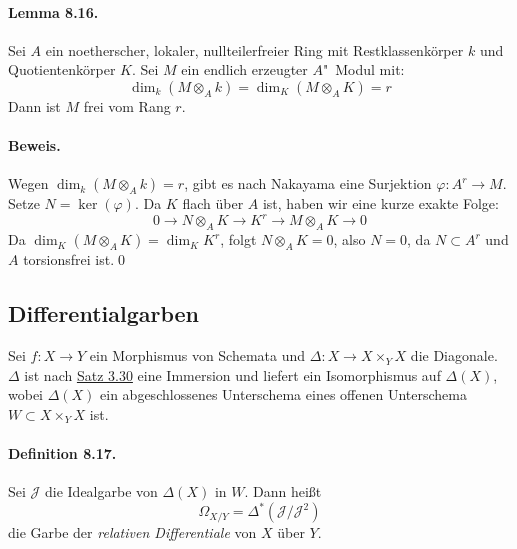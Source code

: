 \paragraph{Lemma 8.16.}\label{8.16} Sei $A$ ein noetherscher, lokaler, nullteilerfreier Ring mit Restklassenkörper $k$ und Quotientenkörper $K$. Sei $M$ ein endlich erzeugter $A$"~Modul mit:
\[\dim_k(M\otimes_Ak)=\dim_K(M\otimes_AK)=r \]
Dann ist $M$ frei vom Rang $r$.

\paragraph{Beweis.} Wegen $\dim_k(M\otimes_Ak)=r$, gibt es nach Nakayama eine Surjektion $\varphi:A^r\to M$. Setze $N=\ker(\varphi)$. Da $K$ flach über $A$ ist, haben wir eine kurze exakte Folge:
\[0\longrightarrow N\otimes_AK\longrightarrow K^r\longrightarrow M\otimes_AK\longrightarrow 0 \]
Da $\dim_K(M\otimes_AK)=\dim_KK^r$, folgt $N\otimes_AK=0$, also $N=0$, da $N\subset A^r$ und $A$ torsionsfrei ist.\qed

\subsection{Differentialgarben}

Sei $f:X\to Y$ ein Morphismus von Schemata und $\Delta:X\to X\times_YX$ die Diagonale. $\Delta$ ist nach \hyperref[3.30]{Satz 3.30} eine Immersion und liefert ein Isomorphismus auf $\Delta(X)$, wobei $\Delta(X)$ ein abgeschlossenes Unterschema eines offenen Unterschema $W\subset X\times_YX$ ist.

\paragraph{Definition 8.17.}\label{8.17} Sei $\mathcal{J}$ die Idealgarbe von $\Delta(X)$ in $W$. Dann heißt
\[\Omega_{X/Y}=\Delta^\ast(\mathcal{J}/\mathcal{J}^2) \]
die Garbe der \textit{relativen Differentiale} von $X$ über $Y$.

